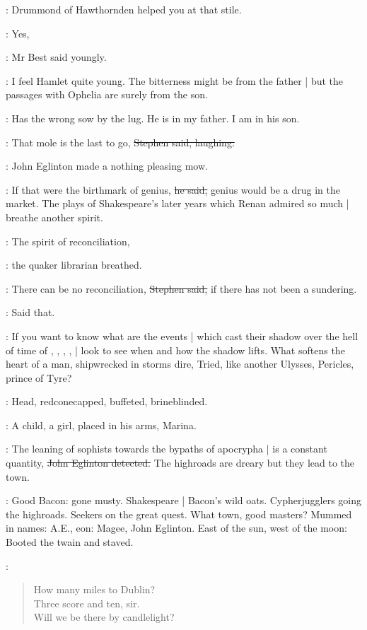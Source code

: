 \StephenInt:
Drummond of Hawthornden helped you at that stile.

\best:
Yes,

:
Mr Best said youngly.

\best:
I feel Hamlet quite young.
The bitterness might be from the father |
but the passages with Ophelia are surely from the son.

\StephenInt:
Has the wrong sow by the lug.
He is in my father.
I am in his son.

\Stephen:
That mole is the last to go,
\sout{Stephen said, laughing.}

:
John Eglinton made a nothing pleasing mow.

\eglinton:
If that were the birthmark of genius,
\sout{he said,}
genius would be a drug in the market.
The plays of Shakespeare's later years which Renan admired so much |
breathe another spirit.

\librarian:
The spirit of reconciliation,

:
the quaker librarian breathed.

\Stephen:
There can be no reconciliation,
\sout{Stephen said,}
if there has not been a sundering.

\StephenInt:
Said that.

\Stephen:
If you want to know what are the events |
which cast their shadow over the hell of time of
,
,
,
, |
look to see when and how the shadow lifts.
What softens the heart of a man,
shipwrecked in storms dire,
Tried,
like another Ulysses,
Pericles, prince of Tyre?

\StephenInt:
Head,
redconecapped,
buffeted,
brineblinded.

\Stephen:
A child, a girl,
placed in his arms,
Marina.

\eglinton:
The leaning of sophists towards the bypaths of apocrypha |
is a constant quantity,
\sout{John Eglinton detected.}
The highroads are dreary but they lead to the town.

\StephenInt:
Good Bacon:
gone musty.
Shakespeare |
Bacon's wild oats.
Cypherjugglers going the highroads.
Seekers on the great quest.
What town,
good masters?
Mummed in names:
A.E.,
eon:
Magee,
John Eglinton.
East of the sun,
west of the moon:
Booted the twain and staved.

\StephenInt:
\begin{verse}
    How many miles to Dublin? \\
    Three score and ten, sir. \\
    Will we be there by candlelight?
\end{verse}

